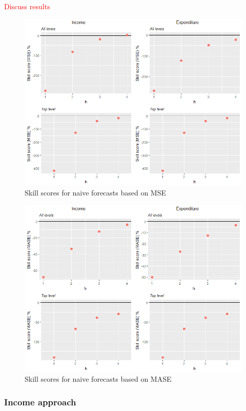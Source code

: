 \documentclass[graybox]{svmult}
\begin{document}
\textcolor{red}{Discuss results}

\begin{figure}[H]
	\centering
	\small
	\includegraphics[scale=0.50]{Figs/Results/NaiveVsBase_MSE.png}
	\caption{Skill scores for naive forecasts based on MSE}\label{NaiveVsBase_MSE}
\end{figure}

\begin{figure}[H]
	\centering
	\small
	\includegraphics[scale=0.50]{Figs/Results/NaiveVsBase_MASE.png}
	\caption{Skill scores for naive forecasts based on MASE}\label{NaiveVsBase_MASE}
\end{figure}
\subsubsection*{Income approach}
\end{document}
